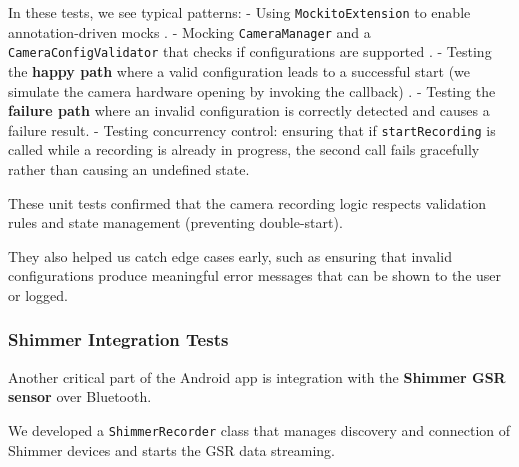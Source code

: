 {{In these tests, we see typical patterns: - Using \texttt{MockitoExtension} to enable annotation-driven mocks
.
- Mocking \texttt{CameraManager} and a \texttt{CameraConfigValidator} that checks if configurations are supported
. - Testing the \textbf{happy path}
where a valid configuration leads to a successful start (we simulate the camera hardware opening by invoking the callback)
. - Testing the \textbf{failure path}
where an invalid configuration is correctly detected and causes a failure
result. - Testing concurrency control: ensuring that if \texttt{startRecording}
is called while a recording is already in progress, the second call fails
gracefully rather than causing an undefined state.

These unit tests confirmed that the camera recording logic respects validation
rules and state management (preventing double-start).

They also helped us catch edge cases early, such as ensuring that invalid
configurations produce meaningful error messages that can be shown to the user
or logged.

\subsubsection{Shimmer Integration Tests}

Another critical part of the Android app is integration with the \textbf{Shimmer GSR sensor}
 over Bluetooth.

We developed a \texttt{ShimmerRecorder} class that manages discovery and
connection of Shimmer devices and starts the GSR data streaming.

}}
